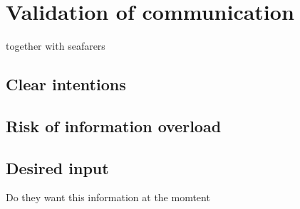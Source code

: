 \chapter{Validation of communication}
together with seafarers

\section{Clear intentions}

\section{Risk of information overload}

\section{Desired input}
Do they want this information at the momtent 